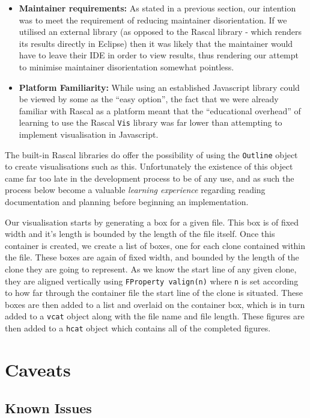 \documentclass{article}
\begin{document}
\begin{itemize}
\item \textbf{Maintainer requirements:} As stated in a previous section, our intention was to meet the requirement of reducing maintainer disorientation. If we utilised an external library (as opposed to the Rascal library - which renders its results directly in Eclipse) then it was likely that the maintainer would have to leave their IDE in order to view results, thus rendering our attempt to minimise maintainer disorientation somewhat pointless.
\item \textbf{Platform Familiarity:} While using an established Javascript library could be viewed by some as the ``easy option'', the fact that we were already familiar with Rascal as a platform meant that the ``educational overhead'' of learning to use the Rascal \texttt{Vis} library was far lower than attempting to implement visualisation in Javascript.
\end{itemize}

The built-in Rascal libraries do offer the possibility of using the \texttt{Outline} object to create visualisations such as this. Unfortunately the existence of this object came far too late in the development process to be of any use, and as such the process below become a valuable \textit{learning experience} regarding reading documentation and planning before beginning an implementation.

Our visualisation starts by generating a box for a given file. This box is of fixed width and it's length is bounded by the length of the file itself. Once this container is created, we create a list of boxes, one for each clone contained within the file. These boxes are again of fixed width, and bounded by the length of the clone they are going to represent. As we know the start line of any given clone, they are aligned vertically using \texttt{FProperty valign(n)} where \texttt{n} is set according to how far through the container file the start line of the clone is situated. These boxes are then added to a list and overlaid on the container box, which is in turn added to a \texttt{vcat} object along with the file name and file length. These figures are then added to a \texttt{hcat} object which contains all of the completed figures.

\section{Caveats}
\subsection{Known Issues}
\end{document}
